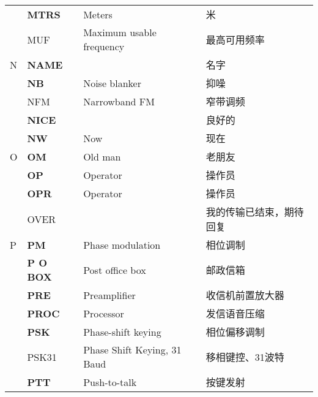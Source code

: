 \begin{longtable}[l]{llll}
    & \textbf{MTRS}                     & Meters                                  & 米                   \\
    & MUF                               & Maximum usable frequency                & 最高可用频率              \\
  N & \textbf{NAME}                     &                                         & 名字                  \\
    & \textbf{NB}                       & Noise blanker                           & 抑噪                  \\
    & NFM                               & Narrowband FM                           & 窄带调频                \\
    & \textbf{NICE}                     &                                         & 良好的                 \\
    & \textbf{NW}                       & Now                                     & 现在                  \\
  O & \textbf{OM}                       & Old man                                 & 老朋友                 \\%
    & \textbf{OP}                       & Operator                                & 操作员                 \\
    & \textbf{OPR}                      & Operator                                & 操作员                 \\
    & OVER                              &                                         & 我的传输已结束，期待回复        \\
  P & \textbf{PM}                       & Phase modulation                        & 相位调制                \\
    & \textbf{P O BOX}                  & Post office box                         & 邮政信箱                \\
    & \textbf{PRE}                      & Preamplifier                            & 收信机前置放大器            \\
    & \textbf{PROC}                     & Processor                               & 发信语音压缩              \\
    & \textbf{PSK}                      & Phase-shift keying                      & 相位偏移调制              \\
    & PSK31                             & Phase Shift Keying, 31 Baud             & 移相键控、31波特           \\
    & \textbf{PTT}                      & Push-to-talk                            & 按键发射                \\

\end{longtable}
